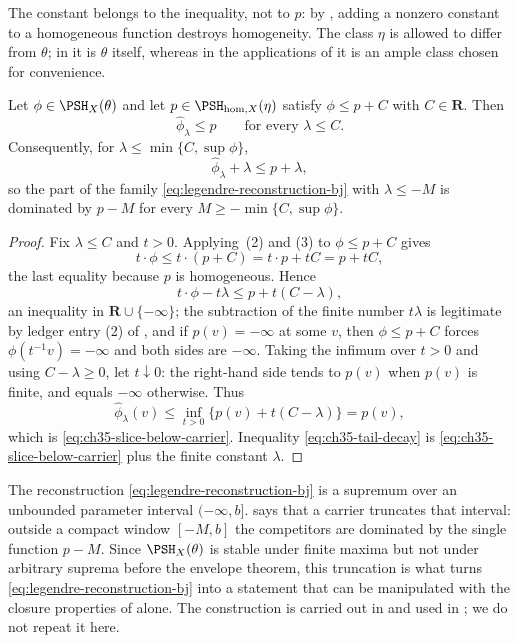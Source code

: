 The constant belongs to the inequality, not to $p$: by
, adding a nonzero constant to a
homogeneous function destroys homogeneity.  The class $\eta$ is allowed to
differ from $\theta$; in  it is
$\theta$ itself, whereas in the applications of
 it is an ample class chosen for convenience.

\begin{lemma}
\label{lem:ch35-carrier-tail}
Let $\phi\in\PSH_X(\theta)$ and let
$p\in\PSH_{\mathrm{hom},X}(\eta)$ satisfy
$\phi\leq p+C$ with $C\in\mathbf R$.  Then
\begin{equation}
\label{eq:ch35-slice-below-carrier}
 \widehat\phi_\lambda\leq p
 \qquad\text{for every }\lambda\leq C .
\end{equation}
Consequently, for $\lambda\leq\min\{C,\sup\phi\}$,
\begin{equation}
\label{eq:ch35-tail-decay}
 \widehat\phi_\lambda+\lambda\leq p+\lambda,
\end{equation}
so the part of the family \eqref{eq:legendre-reconstruction-bj} with
$\lambda\leq-M$ is dominated by $p-M$ for every
$M\geq-\min\{C,\sup\phi\}$.
\end{lemma}

\begin{proof}
Fix $\lambda\leq C$ and $t>0$.  Applying
\,(2) and (3) to
$\phi\leq p+C$ gives
\[
 t\cdot\phi\leq t\cdot(p+C)=t\cdot p+tC=p+tC,
\]
the last equality because $p$ is homogeneous.  Hence
\[
 t\cdot\phi-t\lambda\leq p+t(C-\lambda),
\]
an inequality in $\mathbf R\cup\{-\infty\}$; the subtraction of the finite
number $t\lambda$ is legitimate by ledger entry (2) of
, and if $p(v)=-\infty$ at some $v$, then
$\phi\leq p+C$ forces $\phi(t^{-1}v)=-\infty$ and both sides are
$-\infty$.  Taking the infimum over $t>0$ and using
$C-\lambda\geq0$, let $t\downarrow0$: the right-hand side tends to
$p(v)$ when $p(v)$ is finite, and equals $-\infty$ otherwise.  Thus
\[
 \widehat\phi_\lambda(v)\leq\inf_{t>0}\{p(v)+t(C-\lambda)\}=p(v),
\]
which is \eqref{eq:ch35-slice-below-carrier}.  Inequality
\eqref{eq:ch35-tail-decay} is \eqref{eq:ch35-slice-below-carrier} plus the
finite constant $\lambda$.
\end{proof}

\begin{remark}
\label{rem:ch35-carrier-purpose}
The reconstruction \eqref{eq:legendre-reconstruction-bj} is a supremum over
an unbounded parameter interval $(-\infty,b]$.
 says that a carrier truncates that interval:
outside a compact window $[-M,b]$ the competitors are dominated by the
single function $p-M$.  Since $\PSH_X(\theta)$ is stable under finite
maxima but not under arbitrary suprema before the envelope theorem, this
truncation is what turns \eqref{eq:legendre-reconstruction-bj} into a
statement that can be manipulated with the closure properties of
 alone.  The construction is carried out in
 and used in
; we do not repeat it here.
\end{remark}

